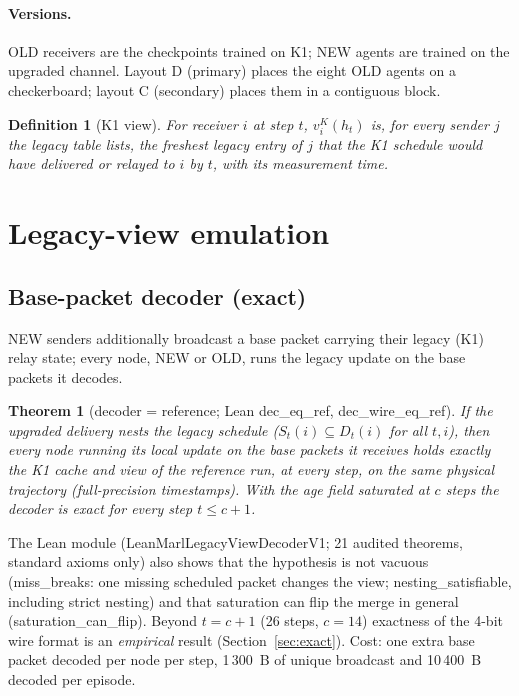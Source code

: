 \documentclass[11pt]{article}
\newcommand{\lean}[1]{\textsf{\footnotesize #1}}
\newtheorem{theorem}{Theorem}
\newtheorem{definition}{Definition}
\begin{document}
\paragraph{Versions.} OLD receivers are the checkpoints trained on K1; NEW agents are trained on the upgraded channel. Layout D (primary)
places the eight OLD agents on a checkerboard; layout C (secondary) places them in a contiguous block.

\begin{definition}[K1 view]
For receiver $i$ at step $t$, $v^K_i(h_t)$ is, for every sender $j$ the legacy table lists, the freshest legacy entry of $j$ that the K1
schedule would have delivered or relayed to $i$ by $t$, with its measurement time.
\end{definition}

\section{Legacy-view emulation}
\subsection{Base-packet decoder (exact)}
NEW senders additionally broadcast a base packet carrying their legacy (K1) relay state; every node, NEW or OLD, runs the legacy update
on the base packets it decodes.
\begin{theorem}[decoder = reference; Lean \lean{dec\_eq\_ref}, \lean{dec\_wire\_eq\_ref}]\label{thm:dec}
If the upgraded delivery nests the legacy schedule ($S_t(i)\subseteq D_t(i)$ for all $t,i$), then every node running its local update on
the base packets it receives holds exactly the K1 cache and view of the reference run, at every step, on the same physical trajectory
(full-precision timestamps). With the age field saturated at $c$ steps the decoder is exact for every step $t\le c+1$.
\end{theorem}
The Lean module (\lean{LeanMarlLegacyViewDecoderV1}; 21 audited theorems, standard axioms only) also shows that the hypothesis is not
vacuous (\lean{miss\_breaks}: one missing scheduled packet changes the view; \lean{nesting\_satisfiable}, including strict nesting) and
that saturation can flip the merge in general (\lean{saturation\_can\_flip}). Beyond $t=c+1$ (26 steps, $c=14$) exactness of the 4-bit
wire format is an \emph{empirical} result (Section~\ref{sec:exact}). Cost: one extra base packet decoded per node per step, 1\,300~B of
unique broadcast and 10\,400~B decoded per episode.
\end{document}
